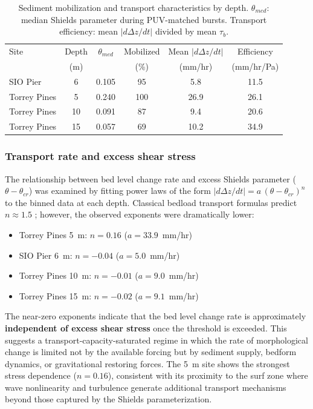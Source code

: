 \begin{table}[h]
\centering
\caption{Sediment mobilization and transport characteristics by depth.
$\theta_{med}$: median Shields parameter during PUV-matched bursts.
Transport efficiency: mean $|d\Delta z/dt|$ divided by mean $\tau_b$.}
\label{tab:thresholds}
\begin{tabular}{lccccc}
\toprule
Site & Depth & $\theta_{med}$ & Mobilized & Mean $|d\Delta z/dt|$ & Efficiency \\
 & (m) & & (\%) & (mm/hr) & (mm/hr/Pa) \\
\midrule
SIO Pier & 6 & 0.105 & 95 & 5.8 & 11.5 \\
Torrey Pines & 5 & 0.240 & 100 & 26.9 & 26.1 \\
Torrey Pines & 10 & 0.091 & 87 & 9.4 & 20.6 \\
Torrey Pines & 15 & 0.057 & 69 & 10.2 & 34.9 \\
\bottomrule
\end{tabular}
\end{table}

\subsubsection{Transport rate and excess shear stress}

The relationship between bed level change rate and excess Shields
parameter ($\theta - \theta_{cr}$) was examined by fitting power
laws of the form $|d\Delta z/dt| = a\,(\theta - \theta_{cr})^n$ to
the binned data at each depth. Classical bedload transport formulas
predict $n \approx 1.5$ \citep[Meyer-Peter M\"uller,][]{soulsby1997};
however, the observed exponents were dramatically lower:

\begin{itemize}
  \item Torrey Pines 5~m: $n = 0.16$ ($a = 33.9$~mm/hr)
  \item SIO Pier 6~m: $n = -0.04$ ($a = 5.0$~mm/hr)
  \item Torrey Pines 10~m: $n = -0.01$ ($a = 9.0$~mm/hr)
  \item Torrey Pines 15~m: $n = -0.02$ ($a = 9.1$~mm/hr)
\end{itemize}

The near-zero exponents indicate that the bed level change rate is
approximately \textbf{independent of excess shear stress} once the
threshold is exceeded. This suggests a transport-capacity-saturated
regime in which the rate of morphological change is limited not by
the available forcing but by sediment supply, bedform dynamics, or
gravitational restoring forces. The \SI{5}{\meter} site shows the
strongest stress dependence ($n = 0.16$), consistent with its
proximity to the surf zone where wave nonlinearity and turbulence
generate additional transport mechanisms beyond those captured by
the Shields parameterization.

